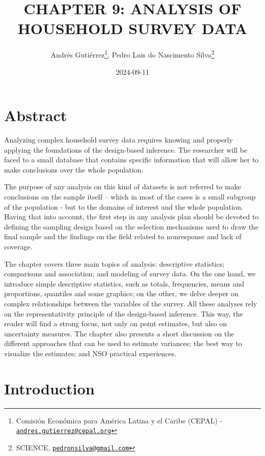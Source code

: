 \documentclass[
  12pt,
]{book}
\title{CHAPTER 9: ANALYSIS OF HOUSEHOLD SURVEY DATA}
\author{Andrés Gutiérrez\footnote{Comisión Económica para América Latina y el Caribe (CEPAL) - \href{mailto:andres.gutierrez@cepal.org}{\nolinkurl{andres.gutierrez@cepal.org}}}, Pedro Luis do Nascimento Silva\footnote{SCIENCE, \href{mailto:pedronsilva@gmail.com}{\nolinkurl{pedronsilva@gmail.com}}}}
\date{2024-09-11}
\begin{document}
\maketitle

{
\hypersetup{linkcolor=}
\setcounter{tocdepth}{0}
\tableofcontents
}
\listoffigures
\listoftables
\hypertarget{abstract}{%
\chapter*{Abstract}\label{abstract}}

Analyzing complex household survey data requires knowing and properly applying the foundations of the design-based inference. The researcher will be faced to a small database that contains specific information that will allow her to make conclusions over the whole population.

The purpose of any analysis on this kind of datasets is not referred to make conclusions on the sample itself -- which in most of the cases is a small subgroup of the population - but to the domains of interest and the whole population. Having that into account, the first step in any analysis plan should be devoted to defining the sampling design based on the selection mechanisms used to draw the final sample and the findings on the field related to nonresponse and lack of coverage.

The chapter covers three main topics of analysis: descriptive statistics; comparisons and association; and modeling of survey data. On the one hand, we introduce simple descriptive statistics, such as totals, frequencies, means and proportions, quantiles and some graphics; on the other, we delve deeper on complex relationships between the variables of the survey. All these analyses rely on the representativity principle of the design-based inference. This way, the reader will find a strong focus, not only on point estimates, but also on uncertainty measures. The chapter also presents a short discussion on the different approaches that can be used to estimate variances; the best way to visualize the estimates; and NSO practical experiences.

\hypertarget{introduction}{%
\chapter*{Introduction}\label{introduction}}
\end{document}
